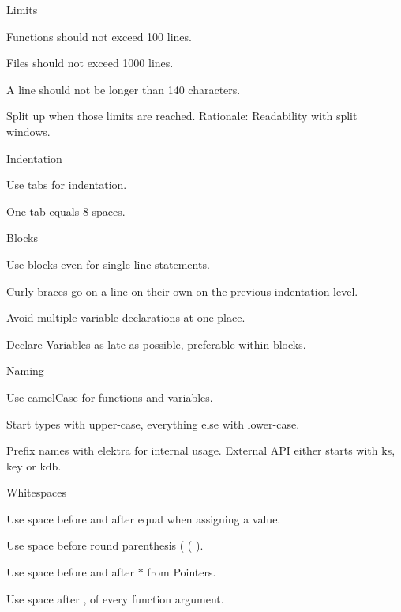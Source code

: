\begin{DoxyItemize}
\item Limits
\begin{DoxyItemize}
\item Functions should not exceed 100 lines.
\item Files should not exceed 1000 lines.
\item A line should not be longer than 140 characters.
\end{DoxyItemize}

Split up when those limits are reached. Rationale\+: Readability with split windows.
\item Indentation
\begin{DoxyItemize}
\item Use tabs for indentation.
\item One tab equals 8 spaces.
\end{DoxyItemize}
\item Blocks
\begin{DoxyItemize}
\item Use blocks even for single line statements.
\item Curly braces go on a line on their own on the previous indentation level.
\item Avoid multiple variable declarations at one place.
\item Declare Variables as late as possible, preferable within blocks.
\end{DoxyItemize}
\item Naming
\begin{DoxyItemize}
\item Use camel\+Case for functions and variables.
\item Start types with upper-\/case, everything else with lower-\/case.
\item Prefix names with {\ttfamily elektra} for internal usage. External A\+PI either starts with {\ttfamily ks}, {\ttfamily key} or {\ttfamily kdb}.
\end{DoxyItemize}
\item Whitespaces
\begin{DoxyItemize}
\item Use space before and after equal when assigning a value.
\item Use space before round parenthesis ( {\ttfamily (} ).
\item Use space before and after {\ttfamily $\ast$} from Pointers.
\item Use space after {\ttfamily ,} of every function argument.
\end{DoxyItemize}
\end{DoxyItemize}

